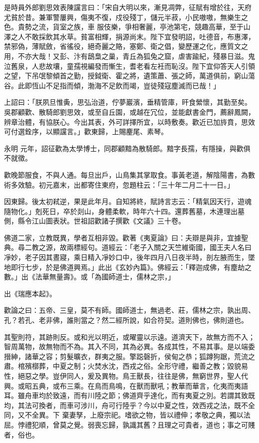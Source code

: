 \begin{pinyinscope}
 是時員外郎劉思效表陳讜言曰：「宋自大明以來，漸見凋弊，征賦有增於往，天府尤貧於昔。兼軍警屢興，傷夷不復，戍役殘丁，儲元半菽，小民嗷嗷，無樂生之色。貴勢之流，貨室之族，車
 服伎樂，爭相奢麗，亭池第宅，競趣高華，至于山澤之人不敢採飲其水草。貧富相輝，捐源尚末。陛下宜發明詔，吐德音，布惠澤，禁邪偽，薄賦斂，省徭役，絕奇麗之賂，塞鄭、衛之倡，變歷運之化，應質文之用，不亦大哉！又彭、汴有鴟梟之巢，青丘為狐兔之窟，虐害踰紀，殘暴日滋。鬼泣舊泉，人悲故壤，童孺視編發而慚生，耆老看左衽而恥沒。陛下宜仰答天人引領之望，下吊氓黎傾首之勤，授鉞衛、霍之將，遺策蕭、張之師，萬道俱前，窮山蕩谷。此即恆山不足指而傾，渤海不足飲而竭，豈徒殘寇塵滅而已哉！」



 上詔曰：「朕夙旦惟夤，思弘治道，佇夢巖濱，垂精管庫，旰食縈懷，其勤至矣。吳郡顧歡、散騎郎劉思效，或至自丘園，或越在冗位，並能獻書金門，薦辭鳳闕，辨章治體，有協朕心。今出其表，外可詳擇所宜，以時敷奏。歡近已加旍賁，思效可付選銓序，以顯讜言。」歡東歸，上賜麈尾、素琴。



 永明
 元年，詔征歡為太學博士，同郡顧黯為散騎郎。黯字長孺，有隱操，與歡俱不就徵。



 歡晚節服食，不與人通。每旦出戶，山鳥集其掌取食。事黃老道，解陰陽書，為數術多效驗。初元嘉末，出都寄住東府，忽題柱云：「三十年二月二十一日。」



 因東歸。後太初弒逆，果是此年月。自知將終，賦詩言志云：「精氣因天行，遊魂隨物化。」剋死日，卒於剡山，身體柔軟，時年六十四。還葬舊墓，木連理出墓側，縣令江山圖表狀。世祖詔歡諸子撰歡《文議》三十卷。



 佛道二家，立教既異，學者互相非毀。歡著《夷夏論》曰：夫辯是與非，宜據聖典。尋二教之源，故兩標經句。道經云：「老子入關之天竺維衛國，國王夫人名曰凈妙，老子因其晝寢，乘日精入凈妙口中，後年四月八日夜半時，剖左腋而生，墜地即行七步，於是佛道興焉。」此出《玄妙內篇》。佛經云：「釋迦成佛，有塵劫之數。」出《法華無量壽》。或「為國師道士，儒林之宗，」



 出《瑞應本起》。



 歡論之曰：五帝、三皇，莫不有師。國師道士，無過老、莊，儒林之宗，孰出周、孔？若孔、老非佛，誰則當之？然二經所說，如合符契。道則佛也，佛則道也。



 其聖則符，其跡則反。或和光以明近，或曜靈以示遠。道濟天下，故無方而不入；智周萬物，故無物而不為。其入不同，其為必異。各成其性，不易其事。是以端委搢紳，諸華之容；剪髮曠衣，群夷之服。擎跽磬折，侯甸之恭；狐蹲狗踞，荒流之肅。棺殯槨葬，中夏之制；火焚水沈，西戎之俗。全形守禮，繼善之教；毀貌易性，絕惡之學。豈伊同人，爰及異物。鳥王獸長，往往是佛，無窮世界，聖人代興。或昭五典，或布三乘。在鳥而鳥鳴，在獸而獸吼；教華而華言，化夷而夷語耳。雖舟車均於致遠，而有川陸之節；佛道齊乎達化，而有夷夏之別。若謂其致既均，其法可換者，而車可涉川，舟可行陸乎？今以中夏之性，效西戎之法，既不全同，又不全異。下
 棄妻孥，上廢宗祀。嗜欲之物，皆以禮伸；孝敬之典，獨以法屈。悖禮犯順，曾莫之覺。弱喪忘歸，孰識其舊？且理之可貴者，道也；事之可賤者，俗也。




\end{pinyinscope}
